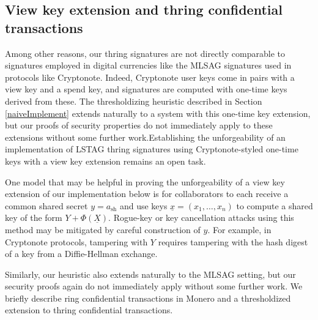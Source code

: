 \documentclass{mrl}
\theoremstyle{definition}
\numberwithin{theorem}{subsection}
\begin{document}
\subsection{View key extension and thring confidential transactions}

Among other reasons, our thring signatures are not directly comparable to signatures employed in digital currencies like the MLSAG signatures used in protocols like Cryptonote. Indeed, Cryptonote user keys come in pairs with a view key and a spend key, and signatures are computed with one-time keys derived from these. The thresholdizing heuristic described in Section \ref{naiveImplement} extends naturally to a system with this one-time key extension, but our proofs of security properties do not immediately apply to these extensions without some further work.Establishing the unforgeability of an implementation of LSTAG thring signatures using Cryptonote-styled one-time keys with a view key extension remains an open task.

One model that may be helpful in proving the unforgeability of a view key extension of our implementation below is for collaborators to each receive a common shared secret $y = a_{\text{sh}}$ and use keys $\underline{x} = (x_1, \ldots, x_n)$ to compute a shared key of the form $Y + \Phi(\underline{X})$. Rogue-key or key cancellation attacks using this method may be mitigated by careful construction of $y$. For example, in Cryptonote protocols, tampering with $Y$ requires tampering with the hash digest of a key from a Diffie-Hellman exchange.

Similarly, our heuristic also extends naturally to the MLSAG setting, but our security proofs again do not immediately apply without some further work.  We briefly describe ring confidential transactions in Monero and a thresholdized extension to thring confidential transactions. 
\end{document}

